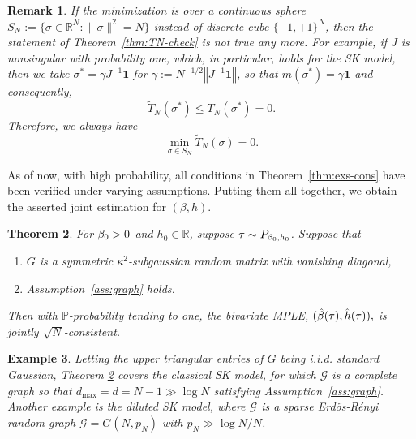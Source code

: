 \documentclass[letterpaper,11pt,reqno]{amsart}
\newtheorem{thm}{Theorem}[section]
\newtheorem{rem}[thm]{Remark}
\newtheorem{ex}[thm]{Example}
\renewcommand{\le}{\leqslant}
\newcommand{\norm}[1]{\left\Vert#1\right\Vert}
\newcommand{\cG}{\mathcal{G}}\newcommand{\cH}{\mathcal{H}}\newcommand{\cI}{\mathcal{I}}
\newcommand{\mvgs}{{\sigma}}
\newcommand{\mvgt}{{\tau}}
\begin{document}
\begin{rem}
    \rm
If the minimization is over a continuous sphere $S_N:=\{\mvgs\in \mathbb{R}^N:\|\mvgs\|^2=N\}$ instead of discrete cube $\{-1,+1\}^N$, then the statement of Theorem~\ref{thm:TN-check} is not true any more. 
For example,  if  $J$ is nonsingular with probability one,  which, in particular, holds for the SK model, then we take $\mvgs^*  =\gamma J^{-1} \mathbf{1} $ for $\gamma := N^{-1/2}\norm{J^{-1} \mathbf{1}}$, 
    so that $m(\mvgs^*) =  \gamma \mathbf{1}$ and consequently,
    \[\widetilde{T}_N(\mvgs^*) \le T_N(\mvgs^*)  = 0.\]
    Therefore, we always have
    \[
    \min_{\mvgs \in S_N} \widetilde{T}_N(\mvgs) = 0.
    \]    
\end{rem}

As of now, with high probability, all conditions in Theorem~\ref{thm:exs-cons} have been verified under varying assumptions. Putting them all together, we obtain the asserted joint estimation for $(\beta,h).$

\begin{thm}\label{thm:conclu}
   For $\beta_0>0$ and $h_0 \in \mathbb{R}$, suppose $\mvgt \sim P_{\gb_0,h_0}$. Suppose that 
   \begin{enumerate}
        \item[$(1)$] $G$ is a symmetric $\kappa^2$-subgaussian random matrix with vanishing diagonal,
        \item[$(2)$] Assumption~\ref{ass:graph} holds.
   \end{enumerate}
   Then with $\mathbb{P}$-probability tending to one, the bivariate MPLE, $(\hat{\gb}(\mvgt),\hat{h}(\mvgt)),$ is jointly $\sqrt{N}$-consistent.
\end{thm}



 
\begin{ex}\rm 
Letting the upper triangular entries of $G$ being i.i.d. standard Gaussian, Theorem \ref{thm:conclu} covers the classical SK model, for which $\cG$ is a complete graph so that $d_{\max} = d = N-1 \gg \log N$ satisfying Assumption~\ref{ass:graph}. Another example is the diluted SK model, where $\cG$ is a sparse Erd\"os-R\'enyi random graph $\cG=G(N,p_N)$ with $p_N \gg {\log N}/{N}$.
\end{ex}
\end{document}
